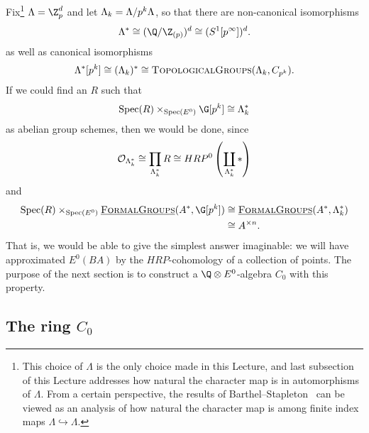 Fix\footnote{This choice of $\Lambda$ is the only choice made in this Lecture, and last subsection of this Lecture addresses how natural the character map is in automorphisms of $\Lambda$.  From a certain perspective, the results of Barthel--Stapleton~\cite{BarthelStapleton} can be viewed as an analysis of how natural the character map is among finite index maps $\Lambda \hookrightarrow \Lambda$.} $\Lambda = \Z_{p}^{d}$ and let $\Lambda_k = \Lambda/p^k\Lambda$, so that there are non-canonical isomorphisms
\[
\Lambda^* \cong (\Q/\Z_{(p)})^d \cong (S^1[p^{\infty}])^d.
\] 
as well as canonical isomorphisms
\[
\Lambda^*[p^k] \cong (\Lambda_{k})^* \cong \normalfont\textsc{TopologicalGroups}(\Lambda_k, C_{p^k}).
\]
If we could find an $R$ such that
\[
\Spec(R) \times_{\Spec(E^0)} \G[p^k] \cong \Lk^*
\]
as abelian group schemes, then we would be done, since
\[
\mathcal{O}_{\Lambda_k^*} \cong \prod_{\Lambda_k^*} R \cong HRP^0\left(\coprod_{\Lambda_k^*} \ast\right)
\]
and
\begin{align*}
\Spec(R) \times_{\Spec(E^0)} \InternalHom{FormalGroups}(A^*, \G[p^k]) & \cong \InternalHom{FormalGroups}(A^*, \Lambda_{k}^*) \\
& \cong A^{\times n}.
\end{align*}
That is, we would be able to give the simplest answer imaginable: we will have approximated $E^0(BA)$ by the $HRP$-cohomology of a collection of points. The purpose of the next section is to construct a $\Q \otimes E^0$-algebra $C_0$ with this property.




\subsection*{The ring $C_0$}


